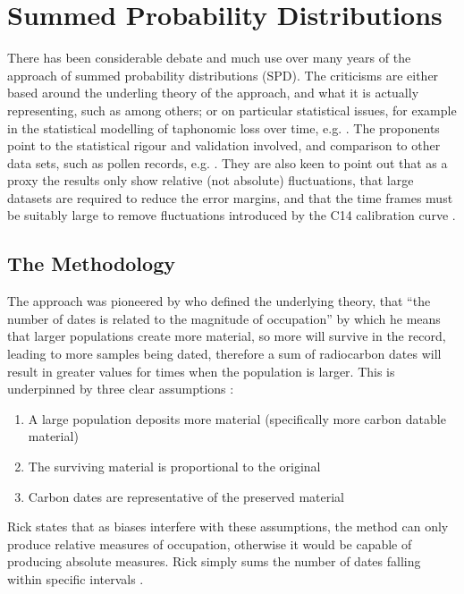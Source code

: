 \section{Summed Probability Distributions}
There has been considerable debate \citep{McLaughlin2016,steele_gkiasta_shennan_2004,Crombe:2004fk,SUROVELL20071868,SUROVELL20091715,BALLENGER20111314,Williams2012578,CONTRERAS2014591,Torfing2015193,Timpson2015199,Torfing2015203} and much use \citep{Shennan2013,Downey30082016,10.1371/journal.pone.0105730,PEROS2010656,HINZ20123331,WOODBRIDGE2014216,TIMPSON2014549,doi:10.1177/0959683614540952} over many years of the approach of summed probability distributions (SPD). The criticisms are either based around the underling theory of the approach, and what it is actually representing, such as \cite{McLaughlin2016,Torfing2015193,CONTRERAS2014591} among others; or on particular statistical issues, for example in the statistical modelling of taphonomic loss over time, e.g. \cite{SUROVELL20091715,steele_gkiasta_shennan_2004,BROWN2015133}. The proponents point to the statistical rigour and validation involved, and comparison to other data sets, such as pollen records, e.g. \cite{WOODBRIDGE2014216}. They are also keen to point out that as a proxy the results only show relative (not absolute) fluctuations, that large datasets are required to reduce the error margins, and that the time frames must be suitably large to remove fluctuations introduced by the C14 calibration curve \citep{Timpson2015199,TIMPSON2014549}.

\subsection{The Methodology}
The approach was pioneered by \citet{10.2307/281060} who defined the underlying theory, that ``the number of dates is related to the magnitude of occupation'' \citep[55]{10.2307/281060} by which he means that larger populations create more material, so more will survive in the record, leading to more samples being dated, therefore a sum of radiocarbon dates will result in greater values for times when the population is larger. This is underpinned by three clear assumptions \citep[56]{10.2307/281060}:
\begin{enumerate}
\item A large population deposits more material (specifically more carbon datable material)
\item The surviving material is proportional to the original
\item Carbon dates are representative of the preserved material 
\end{enumerate}
Rick states that as biases interfere with these assumptions, the method can only produce relative measures of occupation, otherwise it would be capable of producing absolute measures. Rick simply sums the number of dates falling within specific intervals \citep[61]{10.2307/281060}.

